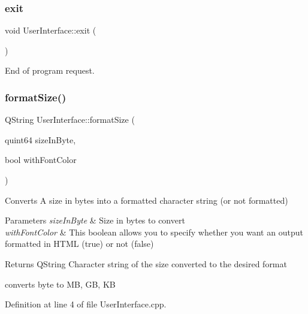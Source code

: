 \subsubsection{\texorpdfstring{exit}{exit}}
{\footnotesize\ttfamily void User\+Interface\+::exit (\begin{DoxyParamCaption}{ }\end{DoxyParamCaption})\hspace{0.3cm}{\ttfamily [signal]}}



End of program request. 

\mbox{\label{class_user_interface_a13152dbf2515f9fd06d8657a2df17686}} 
\subsubsection{\texorpdfstring{format\+Size()}{formatSize()}}
{\footnotesize\ttfamily Q\+String User\+Interface\+::format\+Size (\begin{DoxyParamCaption}\item[{quint64}]{size\+In\+Byte,  }\item[{bool}]{with\+Font\+Color }\end{DoxyParamCaption})\hspace{0.3cm}{\ttfamily [static]}}



Converts A size in bytes into a formatted character string (or not formatted) 


\begin{DoxyParams}{Parameters}
{\em size\+In\+Byte} & Size in bytes to convert \\
\hline
{\em with\+Font\+Color} & This boolean allows you to specify whether you want an output formatted in H\+T\+ML (true) or not (false) \\
\hline
\end{DoxyParams}
\begin{DoxyReturn}{Returns}
Q\+String Character string of the size converted to the desired format
\end{DoxyReturn}
converts byte to MB, GB, KB 

Definition at line 4 of file User\+Interface.\+cpp.

\mbox{\label{class_user_interface_ae9e59c9a5fb9c71ab9897da2027dd3b3}} 
